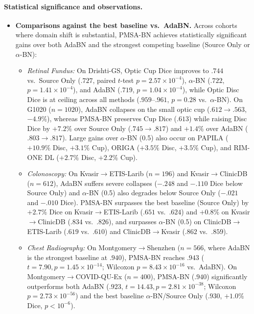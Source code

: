 \documentclass[11pt,a4paper]{article}
\begin{document}
\paragraph{Statistical significance and observations.}
\begin{itemize}
\item \textbf{Comparisons against the best baseline vs.\ AdaBN.} Across cohorts where domain shift is substantial, PMSA-BN achieves statistically significant gains over both AdaBN and the strongest competing baseline (Source Only or $\alpha$-BN):
  \begin{itemize}
  \item \emph{Retinal Fundus:} On Drishti-GS, Optic Cup Dice improves to $.744$ vs.\ Source Only ($.727$, paired $t$-test $p = 2.57\times 10^{-4}$), $\alpha$-BN ($.722$, $p = 1.41\times 10^{-4}$), and AdaBN ($.719$, $p = 1.04\times 10^{-4}$), while Optic Disc Dice is at ceiling across all methods ($.959$--$.961$, $p = 0.28$ vs.\ $\alpha$-BN). On G1020 ($n=1020$), AdaBN collapses on the small optic cup ($.612 \to .563$, $-4.9\%$), whereas PMSA-BN preserves Cup Dice ($.613$) while raising Disc Dice by $+7.2\%$ over Source Only ($.745 \to .817$) and $+1.4\%$ over AdaBN ($.803 \to .817$). Large gains over $\alpha$-BN (0.5) also occur on PAPILA ($+10.9\%$ Disc, $+3.1\%$ Cup), ORIGA ($+3.5\%$ Disc, $+3.5\%$ Cup), and RIM-ONE DL ($+2.7\%$ Disc, $+2.2\%$ Cup).
  \item \emph{Colonoscopy:} On Kvasir$\to$ETIS-Larib ($n=196$) and Kvasir$\to$ClinicDB ($n=612$), AdaBN suffers severe collapses ($-.248$ and $-.110$ Dice below Source Only) and $\alpha$-BN (0.5) also degrades below Source Only ($-.021$ and $-.010$ Dice). PMSA-BN surpasses the best baseline (Source Only) by $+2.7\%$ Dice on Kvasir$\to$ETIS-Larib ($.651$ vs.\ $.624$) and $+0.8\%$ on Kvasir$\to$ClinicDB ($.834$ vs.\ $.826$), and surpasses $\alpha$-BN (0.5) on ClinicDB$\to$ETIS-Larib ($.619$ vs.\ $.610$) and ClinicDB$\to$Kvasir ($.862$ vs.\ $.859$).
  \item \emph{Chest Radiography:} On Montgomery$\to$Shenzhen ($n=566$, where AdaBN is the strongest baseline at $.940$), PMSA-BN reaches $.943$ ($t = 7.90, p = 1.45\times 10^{-14}$; Wilcoxon $p = 8.43\times 10^{-16}$ vs.\ AdaBN). On Montgomery$\to$COVID-QU-Ex ($n=400$), PMSA-BN ($.940$) significantly outperforms both AdaBN ($.923$, $t = 14.43, p = 2.81\times 10^{-38}$; Wilcoxon $p = 2.73\times 10^{-56}$) and the best baseline $\alpha$-BN/Source Only ($.930$, $+1.0\%$ Dice, $p < 10^{-6}$).

\end{itemize}
\end{itemize}
\end{document}
